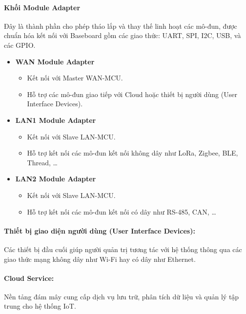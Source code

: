             \paragraph{Khối Module Adapter}\par
                Đây là thành phần cho phép tháo lắp và thay thế linh hoạt các mô-đun, được chuẩn hóa kết nối với Baseboard gồm các giao thức: UART, SPI, I2C, USB, và các GPIO.
                \begin{itemize}
                    \item \textbf{WAN Module Adapter}
                    \begin{itemize}
                        \item Kết nối với Master WAN-MCU.
                        \item Hỗ trợ các mô-đun giao tiếp với Cloud hoặc thiết bị người dùng (User Interface Devices).
                    \end{itemize}
                    \item \textbf{LAN1 Module Adapter}
                    \begin{itemize}
                        \item Kết nối với Slave LAN-MCU.
                        \item Hỗ trợ kết nối các mô-đun kết nối không dây như LoRa, Zigbee, BLE, Thread, \dots
                    \end{itemize}
                    \item \textbf{LAN2 Module Adapter}
                    \begin{itemize}
                        \item Kết nối với Slave LAN-MCU.
                        \item Hỗ trợ kết nối các mô-đun kết nối có dây như RS-485, CAN, \dots
                    \end{itemize}
                \end{itemize}

            \paragraph{Thiết bị giao diện người dùng (User Interface Devices):}\par
                Các thiết bị đầu cuối giúp người quản trị tương tác với hệ thống thông qua các giao thức mạng không dây như Wi-Fi hay có dây như Ethernet.
            \paragraph{Cloud Service:}\par
                Nền tảng đám mây cung cấp dịch vụ lưu trữ, phân tích dữ liệu và quản lý tập trung cho hệ thống IoT.
